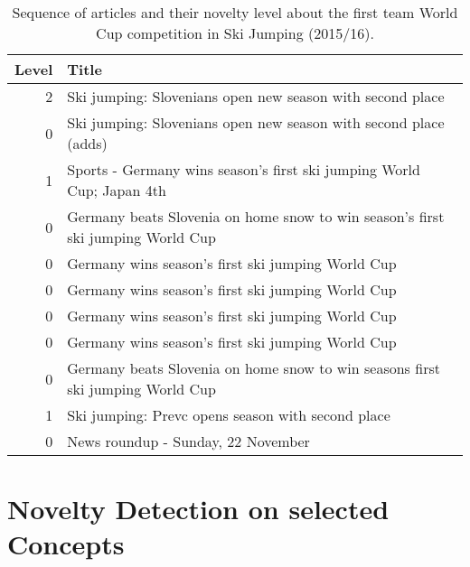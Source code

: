 \documentclass{acm_proc_article-sp}
\begin{document}
\begin{table}[!htb]
	\centering
    \begin{tabular}{|r|l|}
    	\hline
    	Level & Title \\
        \hline
        2 & Ski jumping: Slovenians open new season with second place \\
		0 & Ski jumping: Slovenians open new season with second place (adds) \\
        1 & Sports - Germany wins season's first ski jumping World Cup; Japan 4th \\
        0 & Germany beats Slovenia on home snow to win season's first ski jumping World Cup \\
        0 & Germany wins season's first ski jumping World Cup \\
        0 & Germany wins season's first ski jumping World Cup \\
        0 & Germany wins season's first ski jumping World Cup \\
        0 & Germany wins season's first ski jumping World Cup \\
        0 & Germany beats Slovenia on home snow to win seasons first ski jumping World Cup \\
        1 & Ski jumping: Prevc opens season with second place \\
        0 & News roundup - Sunday, 22 November \\
        \hline
    \end{tabular}
    \caption{Sequence of articles and their novelty level about the first team World Cup competition in Ski Jumping (2015/16).}
	\label{tab:germany}
\end{table}

\section{Novelty Detection on selected Concepts}\label{appendix:selected-concepts} %
\end{document}
